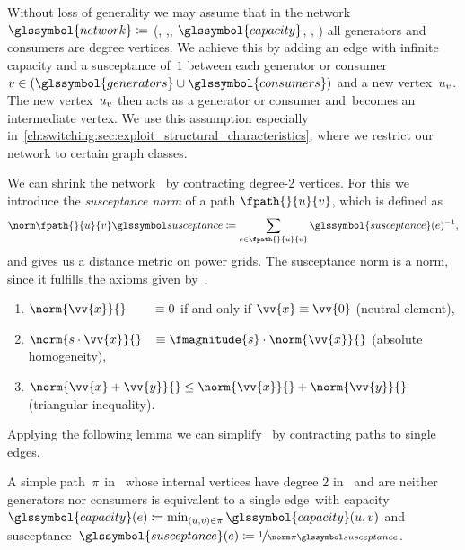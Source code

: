 Without loss of generality we may assume that in the network
$\glssymbol{network} \coloneqq$ (,
,, $\glssymbol{capacity}$,
,
\realpowerdemandmin) all generators and consumers are degree
vertices. We achieve this by adding an edge with infinite capacity and a
susceptance of~$1$ between each generator or
consumer~$\vertexb\in(\glssymbol{generators}\cup\glssymbol{consumers})$ and a new
vertex~$u_{v}$. The new vertex~$u_{v}$ then acts as a
generator or consumer and~\vertexb becomes an intermediate vertex. We use this
assumption especially
in~\cref{ch:switching:sec:exploit_structural_characteristics}, where we restrict
our network to certain graph classes.

We can shrink the network~ by contracting degree-2 vertices.
For this we introduce the \emph{susceptance norm} of a path
$\fpath{}{\vertexa}{\vertexb}$, which is defined as
%
\begin{equation}%
    \bnorm{\fpath{}{\vertexa}{\vertexb}}
    \coloneqq
    \sum_{\edge\in\fpath{}{\vertexa}{\vertexb}}
    \glssymbol{susceptance}(\edge)^{-1},
    \label{eq:bnorm}%
\end{equation}%
% 
and gives us a distance metric on power grids. 
% 
The susceptance norm is a norm, since it fulfills the axioms given
by~\textcite{Ban22}.
% 
\begin{enumerate}
    \item $\norm{\vv{x}}{}\hspace{7.2mm}\equiv 0$ if and only if $\vv{x}\equiv
    \vv{0}$
    (neutral element),
    \item $\norm{ s \cdot \vv{x} }{}\hspace{3mm}\equiv \fmagnitude{s}\cdot\norm{\vv{x}}{}$ 
    \hspace*{21.5mm}(absolute homogeneity),
    \item $\norm{\vv{x}+\vv{y}}{}\leq\norm{\vv{x}}{} + \norm{\vv{y}}{}$ 
    \hspace*{16.5mm}(triangular inequality).
\end{enumerate}
% 
Applying the following lemma we
can simplify~ by contracting paths to single edges.
%
\begin{lemma}%
  A simple path~$\pi$ in~ whose internal vertices have
  degree 2 in~ and are neither generators nor consumers is
  equivalent to a single edge~\edge with capacity~$\glssymbol{capacity}
  (\edge)\coloneqq\min_{(\vertexa,\vertexb)\in\pathu}\glssymbol{capacity}
  (\vertexa,\vertexb)$
  and susceptance~$\glssymbol{susceptance}(\edge)\coloneqq\nicefrac{1}{
\bnorm{\pathu}}$.%
\label{ch:switching:sec:network_modeling:lem:series_contraction}
\end{lemma}%
